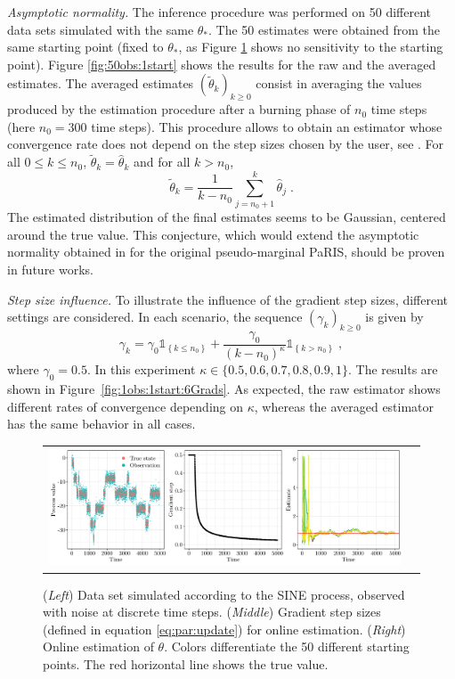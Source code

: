 \documentclass[12pt]{article}
\newcommand{\parvec}{\theta}
\def\1{\mathds{1}}
\newcommand{\eqsp}{\;}
\begin{document}
{\em Asymptotic normality.}
The inference procedure was performed on 50 different data sets simulated with the same $\theta_*$. 
The 50 estimates were obtained from the same starting point (fixed to $\theta_*$, as Figure \ref{fig:1obs:50start} shows no sensitivity to the starting point). Figure \ref{fig:50obs:1start} shows the results for the raw and the averaged estimates. 
 The averaged estimates $(\widetilde \parvec_k)_{k\geqslant 0}$ consist in averaging the values produced by the estimation procedure after a burning phase of $n_0$ time steps (here $n_0 =300$ time steps). 
 This procedure allows to obtain an estimator whose convergence rate does not depend on the step sizes chosen by the user, see \cite{polyak1992acceleration,kushner1997stochastic}. For all $0 \leqslant k\leqslant n_0$, $\widetilde \parvec_k = \widehat\parvec_k $ and for all $k>n_0$,
\[
\widetilde \parvec_k = \frac{1}{k-n_0}\sum_{j= n_0+1}^k\widehat\parvec_j\eqsp. 
\]
The estimated distribution of the final estimates seems to be Gaussian, centered around the true value. 
This conjecture, which would extend the asymptotic normality obtained in \cite{gloaguen2021pseudo} for the original pseudo-marginal PaRIS, should be proven in future works.
 
{\em Step size influence.} To illustrate the  influence of the gradient step sizes, different settings are considered. 
In each scenario, the sequence $(\gamma_k)_{k\geqslant 0}$ is given by
\begin{equation*}
\gamma_k = \gamma_0 \1_{\left\lbrace k \leq n_0 \right\rbrace} + \frac{\gamma_0}{(k - n_0)^{\kappa}}\1_{\left\lbrace k > n_0 \right\rbrace}\eqsp,
\end{equation*}
where $\gamma_0 = 0.5$. In this experiment $\kappa\in\{0.5,0.6,0.7,0.8,0.9,1\}$.
The results are shown in Figure~\ref{fig:1obs:1start:6Grads}. 
As expected, the raw estimator shows different rates of convergence depending on $\kappa$, whereas the averaged estimator has the same behavior in all cases. 

\begin{figure}
\centering
\begin{tabular}{cc}
\includegraphics[width = \textwidth]{Figure4.pdf}&
\end{tabular} 
\caption{\label{fig:1obs:50start}(\textit{Left}) Data set simulated according to the SINE process, observed with noise at discrete time steps. (\textit{Middle}) Gradient step sizes (defined in equation \eqref{eq:par:update}) for online estimation. (\textit{Right}) Online estimation of $\parvec$. Colors differentiate the 50 different starting points. The red horizontal line shows the true value.}
\end{figure}
\end{document}

